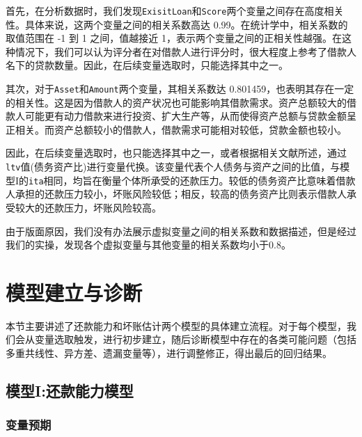 \documentclass[13.5pt,hyperref,a4paper,UTF8]{ctexart}
\begin{document}
首先，在分析数据时，我们发现\texttt{ExisitLoan}和\texttt{Score}两个变量之间存在高度相关性。具体来说，这两个变量之间的相关系数高达 0.99。在统计学中，相关系数的取值范围在 -1 到 1 之间，值越接近 1，表示两个变量之间的正相关性越强。在这种情况下，我们可以认为评分者在对借款人进行评分时，很大程度上参考了借款人名下的贷款数量。因此，在后续变量选取时，只能选择其中之一。

其次，对于\texttt{Asset}和\texttt{Amount}两个变量，其相关系数达 0.801459，也表明其存在一定的相关性。这是因为借款人的资产状况也可能影响其借款需求。资产总额较大的借款人可能更有动力借款来进行投资、扩大生产等，从而使得资产总额与贷款金额呈正相关。而资产总额较小的借款人，借款需求可能相对较低，贷款金额也较小。

因此，在后续变量选取时，也只能选择其中之一，或者根据相关文献所述，通过\texttt{ltv}值(债务资产比)进行变量代换。该变量代表个人债务与资产之间的比值，与模型I的\texttt{ita}相同，均旨在衡量个体所承受的还款压力。较低的债务资产比意味着借款人承担的还款压力较小，坏账风险较低；相反，较高的债务资产比则表示借款人承受较大的还款压力，坏账风险较高。

由于版面原因，我们没有办法展示虚拟变量之间的相关系数和数据描述，但是经过我们的实操，发现各个虚拟变量与其他变量的相关系数均小于0.8。



\newpage
\section{模型建立与诊断}
本节主要讲述了还款能力和坏账估计两个模型的具体建立流程。对于每个模型，我们会从变量选取触发，进行初步建立，随后诊断模型中存在的各类可能问题（包括多重共线性、异方差、遗漏变量等），进行调整修正，得出最后的回归结果。

\subsection{模型I:还款能力模型}
\subsubsection{变量预期}
\end{document}
